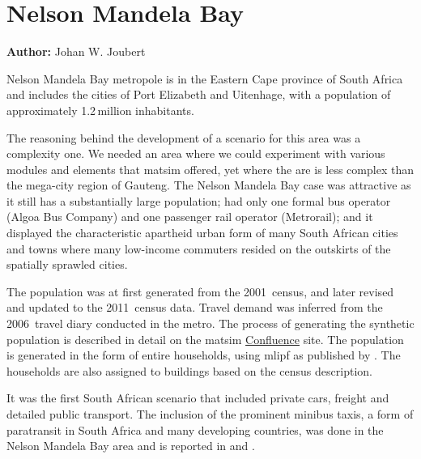 \section{Nelson Mandela Bay}
\label{sec:nelsonMandelaBay}
\hfill \textbf{Author:} Johan W. Joubert

Nelson Mandela Bay metropole is in the Eastern Cape province of South Africa and includes the cities of Port Elizabeth and Uitenhage, with a population of approximately 1.2\,million inhabitants.

The reasoning behind the development of a scenario for this area was a complexity one. We needed an area where we could experiment with various modules and elements that \gls{matsim} offered, yet where the are is less complex than the mega-city region of Gauteng. The Nelson Mandela Bay case was attractive as it still has a substantially large population; had only one formal bus operator (Algoa Bus Company) and one passenger rail operator (Metrorail); and it displayed the characteristic apartheid urban form of many South African cities and towns where many low-income commuters resided on the outskirts of the spatially sprawled cities.

The population was at first generated from the 2001~census, and later revised and updated to the 2011~census data. Travel demand was inferred from the 2006~travel diary conducted in the metro. The process of generating the synthetic population is described in detail on the \gls{matsim} \href{https://matsim.atlassian.net/wiki/display/MATPUB/South+Africa}{Confluence} site. The population is generated in the form of entire households, using \gls{mlipf} as published by \citet[][]{MuellerKAxhausen_LATSIS_2012}. The households are also assigned to buildings based on the census description.

It was the first South African scenario that included private cars, freight and detailed public transport. The inclusion of the prominent minibus taxis, a form of paratransit in South Africa and many developing countries, was done in the Nelson Mandela Bay area and is reported in \citet[][]{Roeder2013MasterMinibus} and \citet[][]{NeumannEtAl2014MinibusRSA}.

